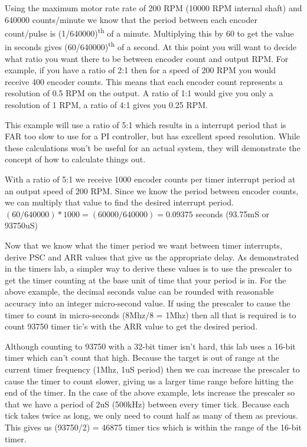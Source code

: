 \documentclass[openany,11pt,fleqn]{book} %
\begin{document}
Using the maximum motor rate rate of 200 RPM (10000 RPM internal shaft) and 640000 counts/minute we know that the period between each encoder count/pulse is (1/640000)\textsuperscript{th} of a minute. Multiplying this by 60 to get the value in seconds gives (60/640000)\textsuperscript{th} of a second. 
At this point you will want to decide what ratio you want there to be between encoder count and output RPM. For example, if you have a ratio of 2:1 then for a speed of 200 RPM you would receive 400 encoder counts. This means that each encoder count represents a resolution of 0.5 RPM on the output. A ratio of 1:1 would give you only a resolution of 1 RPM, a ratio of 4:1 gives you 0.25 RPM. 

This example will use a ratio of 5:1 which results in a interrupt period that is FAR too slow to use for a PI controller, but has excellent speed resolution. While these calculations won't be useful for an actual system, they will demonstrate the concept of how to calculate things out. 

With a ratio of 5:1 we receive 1000 encoder counts per timer interrupt period at an output speed of 200 RPM. Since we know the period between encoder counts, we can multiply that value to find the desired interrupt period. $(60/640000)*1000 = (60000/640000) = 0.09375$ seconds (93.75mS or 93750uS)

Now that we know what the timer period we want between timer interrupts, derive PSC and ARR values that give us the appropriate delay. As demonstrated in the timers lab, a simpler way to derive these values is to use the prescaler to get the timer counting at the base unit of time that your period is in. For the above example, the decimal seconds value can be rounded with reasonable accuracy into an integer micro-second value. If using the prescaler to cause the timer to count in micro-seconds (8Mhz/8 = 1Mhz) then all that is required is to count 93750 timer tic's with the ARR value to get the desired period. 

Although counting to 93750 with a 32-bit timer isn't hard, this lab uses a 16-bit timer which can't count that high. Because the target is out of range at the current timer frequency (1Mhz, 1uS period) then we can increase the prescaler to cause the timer to count slower, giving us a larger time range before hitting the end of the timer. In the case of the above example, lets increase the prescaler so that we have a period of 2uS (500kHz) between every timer tick. Because each tick takes twice as long, we only need to count half as many of them as previous. This gives us (93750/2) = 46875 timer tics which is within the range of the 16-bit timer.
\end{document}
